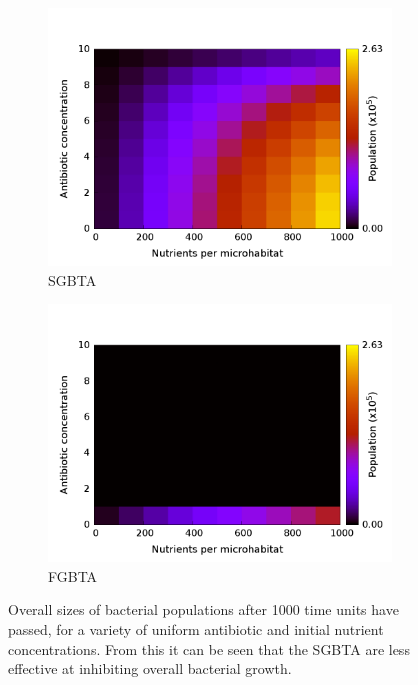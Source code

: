 \documentclass[a4paper,12pt]{article}
\begin{document}
\begin{figure}[H]
 \centering
 \begin{subfigure}[h]{0.49\textwidth}
 \includegraphics[width=\textwidth]{simple-slowGrowers-S_Vs_C-contours}
  \caption{SGBTA}
  \label{subfig:SGBTA-const_C-contours}
  \end{subfigure}
  \begin{subfigure}[h]{0.49\textwidth}
  \includegraphics[width=\textwidth]{simple-fastGrowers-S_Vs_C-contours}
  \caption{FGBTA}
  \label{subfig:FGBTA-const_C-contours}
 \end{subfigure}
\caption{Overall sizes of bacterial populations after 1000 time units have passed, for a variety of uniform antibiotic and initial nutrient concentrations.  
From this it can be seen that the SGBTA are less effective at inhibiting overall bacterial growth.}
\label{fig:const_C-popsize-contours}
\end{figure}
\end{document}
